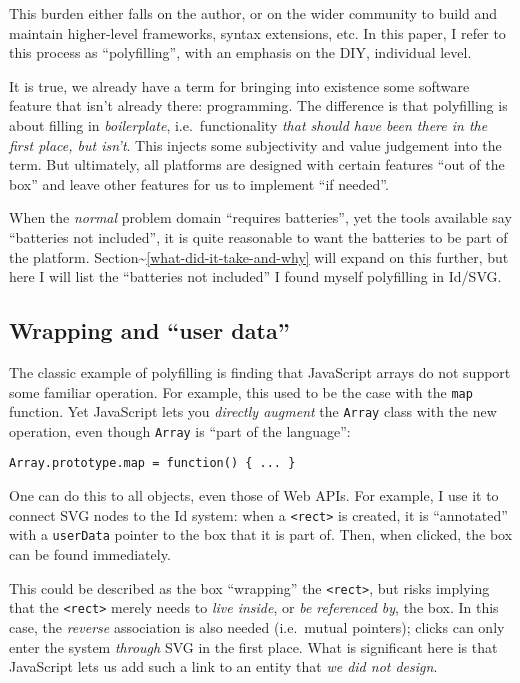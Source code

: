 This burden either falls on the author, or on the wider community to
build and maintain higher-level frameworks, syntax extensions, etc. In
this paper, I refer to this process as ``polyfilling'', with an emphasis
on the DIY, individual level.

It is true, we already have a term for bringing into existence some
software feature that isn't already there: programming. The difference
is that polyfilling is about filling in \emph{boilerplate},
i.e.~functionality \emph{that should have been there in the first place,
but isn't}. This injects some subjectivity and value judgement into the
term. But ultimately, all platforms are designed with certain features
``out of the box'' and leave other features for us to implement ``if
needed''.

When the \emph{normal} problem domain ``requires batteries'', yet the
tools available say ``batteries not included'', it is quite reasonable
to want the batteries to be part of the platform.
Section\textasciitilde{}\ref{what-did-it-take-and-why} will expand on
this further, but here I will list the ``batteries not included'' I
found myself polyfilling in Id{}/SVG.

\hypertarget{wrapping-and-user-data}{%
\subsection{Wrapping and ``user data''}\label{wrapping-and-user-data}}

The classic example of polyfilling is finding that JavaScript arrays do
not support some familiar operation. For example, this used to be the
case with the \texttt{map} function. Yet JavaScript lets you
\emph{directly augment} the \texttt{Array} class with the new operation,
even though \texttt{Array} is ``part of the language'':

\begin{lstlisting}
Array.prototype.map = function() { ... }
\end{lstlisting}

One can do this to all objects, even those of Web APIs. For example, I
use it to connect SVG nodes to the Id{} system: when a
\texttt{\textless{}rect\textgreater{}} is created, it is ``annotated''
with a \texttt{userData} pointer to the box that it is part of. Then,
when clicked, the box can be found immediately.

This could be described as the box ``wrapping'' the
\texttt{\textless{}rect\textgreater{}}, but risks implying that the
\texttt{\textless{}rect\textgreater{}} merely needs to \emph{live
inside}, or \emph{be referenced by}, the box. In this case, the
\emph{reverse} association is also needed (i.e.~mutual pointers); clicks
can only enter the system \emph{through} SVG in the first place. What is
significant here is that JavaScript lets us add such a link to an entity
that \emph{we did not design}.

